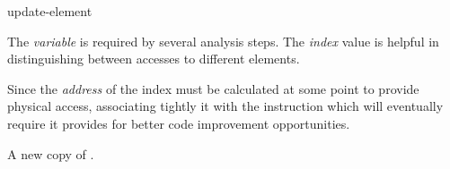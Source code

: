 \begin{instruction}{update-element}

  \begin{notes}
    The \emph{variable} is required by several analysis steps.  The
    \emph{index} value is helpful in distinguishing between accesses
    to different elements.

    Since the \emph{address} of the index must be calculated at some
    point to provide physical access, associating tightly it with the
    instruction which will eventually require it provides for better
    code improvement opportunities.
  \end{notes}

  \begin{results}
  \item A new copy of .
  \end{results}

  \begin{operands}
  \item {}
  \item {}
  \item {}
  \item {}
  \end{operands}

  \begin{seealso}
  \end{seealso}
\end{instruction}

